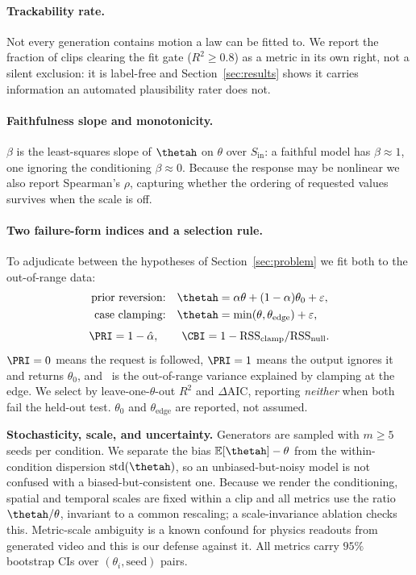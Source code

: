 \documentclass[10pt,twocolumn,letterpaper]{article}
\begin{document}
\paragraph{Trackability rate.}
Not every generation contains motion a law can be fitted to. We report the
fraction of clips clearing the fit gate ($R^2\!\ge\!0.8$) as a metric in its
own right, not a silent exclusion: it is label-free and
Section~\ref{sec:results} shows it carries information an automated
plausibility rater does not.

\paragraph{Faithfulness slope and monotonicity.}
$\beta$ is the least-squares slope of $\thetah$ on $\theta$ over
$S_\text{in}$: a faithful model has $\beta\approx1$, one ignoring the
conditioning $\beta\approx0$. Because the response may be nonlinear we also
report Spearman's $\rho$, capturing whether the ordering of requested values
survives when the scale is off.

\paragraph{Two failure-form indices and a selection rule.}
To adjudicate between the hypotheses of Section~\ref{sec:problem} we fit both
to the out-of-range data:
\begin{align}
\text{prior reversion:}\quad & \thetah = \alpha\theta + (1-\alpha)\theta_0
   + \varepsilon, \label{eq:pri}\\
\text{case clamping:}\quad & \thetah = \min(\theta,\theta_{\text{edge}})
   + \varepsilon, \nonumber
\end{align}
\begin{equation*}
\PRI = 1-\hat\alpha,
\qquad
\CBI = 1 - \mathrm{RSS}_{\text{clamp}}/\mathrm{RSS}_{\text{null}}.
\end{equation*}
$\PRI=0$ means the request is followed, $\PRI=1$ means the output ignores it
and returns $\theta_0$, and \CBI\ is the out-of-range variance explained by
clamping at the edge. We select by leave-one-$\theta$-out $R^2$ and
$\Delta$AIC, reporting \emph{neither} when both fail the held-out test.
$\theta_0$ and $\theta_{\text{edge}}$ are reported, not assumed.

\textbf{Stochasticity, scale, and uncertainty.}
Generators are sampled with $m\ge5$ seeds per condition. We separate the bias
$\mathbb{E}[\thetah]-\theta$ from the within-condition dispersion
$\mathrm{std}(\thetah)$, so an unbiased-but-noisy model is not confused with
a biased-but-consistent one. Because we render the conditioning, spatial and
temporal scales are fixed within a clip and all metrics use the ratio
$\thetah/\theta$, invariant to a common rescaling; a scale-invariance
ablation checks this. Metric-scale ambiguity is a known confound for physics
readouts from generated video \citep{thozhiyoor2026gravity} and this is our
defense against it. All metrics carry $95\%$ bootstrap CIs over
$(\theta_i,\text{seed})$ pairs.
\end{document}
